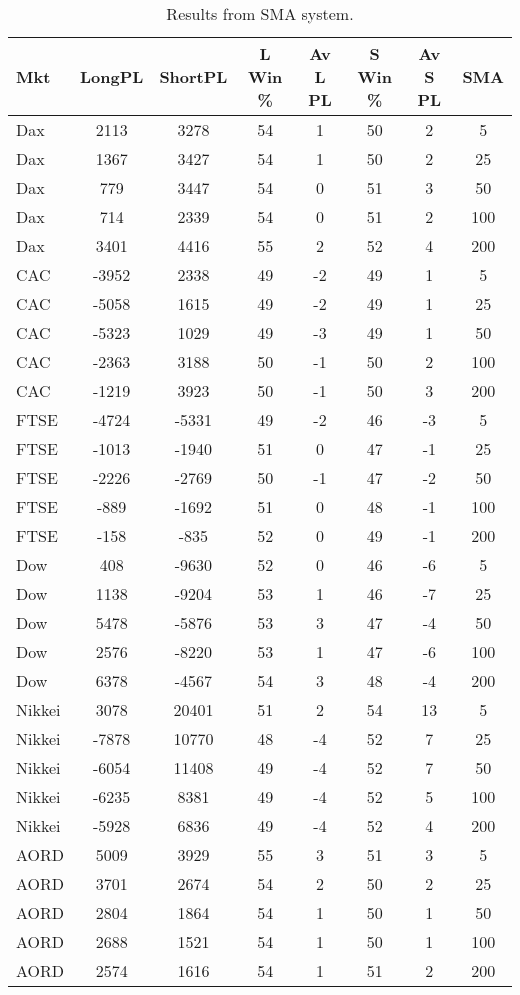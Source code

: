 \begin{table}[ht]
\centering
\caption[SMA Base System]{Results from SMA system.} 
\label{tab:sma_results}
\begin{tabular}{lccccccc}
  \toprule Mkt & LongPL & ShortPL & L Win \% & Av L PL & S Win \% & Av S PL & SMA \\ 
  \midrule Dax & 2113 & 3278 & 54 & 1 & 50 & 2 & 5 \\ 
  Dax & 1367 & 3427 & 54 & 1 & 50 & 2 & 25 \\ 
  Dax & 779 & 3447 & 54 & 0 & 51 & 3 & 50 \\ 
  Dax & 714 & 2339 & 54 & 0 & 51 & 2 & 100 \\ 
  Dax & 3401 & 4416 & 55 & 2 & 52 & 4 & 200 \\ 
  CAC & -3952 & 2338 & 49 & -2 & 49 & 1 & 5 \\ 
  CAC & -5058 & 1615 & 49 & -2 & 49 & 1 & 25 \\ 
  CAC & -5323 & 1029 & 49 & -3 & 49 & 1 & 50 \\ 
  CAC & -2363 & 3188 & 50 & -1 & 50 & 2 & 100 \\ 
  CAC & -1219 & 3923 & 50 & -1 & 50 & 3 & 200 \\ 
  FTSE & -4724 & -5331 & 49 & -2 & 46 & -3 & 5 \\ 
  FTSE & -1013 & -1940 & 51 & 0 & 47 & -1 & 25 \\ 
  FTSE & -2226 & -2769 & 50 & -1 & 47 & -2 & 50 \\ 
  FTSE & -889 & -1692 & 51 & 0 & 48 & -1 & 100 \\ 
  FTSE & -158 & -835 & 52 & 0 & 49 & -1 & 200 \\ 
  Dow & 408 & -9630 & 52 & 0 & 46 & -6 & 5 \\ 
  Dow & 1138 & -9204 & 53 & 1 & 46 & -7 & 25 \\ 
  Dow & 5478 & -5876 & 53 & 3 & 47 & -4 & 50 \\ 
  Dow & 2576 & -8220 & 53 & 1 & 47 & -6 & 100 \\ 
  Dow & 6378 & -4567 & 54 & 3 & 48 & -4 & 200 \\ 
  Nikkei & 3078 & 20401 & 51 & 2 & 54 & 13 & 5 \\ 
  Nikkei & -7878 & 10770 & 48 & -4 & 52 & 7 & 25 \\ 
  Nikkei & -6054 & 11408 & 49 & -4 & 52 & 7 & 50 \\ 
  Nikkei & -6235 & 8381 & 49 & -4 & 52 & 5 & 100 \\ 
  Nikkei & -5928 & 6836 & 49 & -4 & 52 & 4 & 200 \\ 
  AORD & 5009 & 3929 & 55 & 3 & 51 & 3 & 5 \\ 
  AORD & 3701 & 2674 & 54 & 2 & 50 & 2 & 25 \\ 
  AORD & 2804 & 1864 & 54 & 1 & 50 & 1 & 50 \\ 
  AORD & 2688 & 1521 & 54 & 1 & 50 & 1 & 100 \\ 
  AORD & 2574 & 1616 & 54 & 1 & 51 & 2 & 200 \\ 
   \bottomrule \end{tabular}
\end{table}
